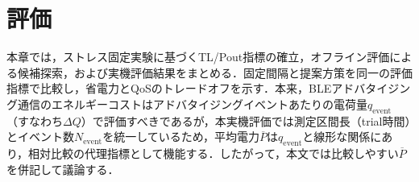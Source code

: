 \chapter{評価}
\label{ch:evaluation}
\clearpage

本章では，ストレス固定実験に基づくTL/Pout指標の確立，オフライン評価による候補探索，および実機評価結果をまとめる．固定間隔と提案方策を同一の評価指標で比較し，省電力とQoSのトレードオフを示す．本来，BLEアドバタイジング通信のエネルギーコストはアドバタイジングイベントあたりの電荷量$q_{\mathrm{event}}$（すなわち$\Delta Q$）で評価すべきであるが，本実機評価では測定区間長（trial時間）とイベント数$N_{\mathrm{event}}$を統一しているため，平均電力$\overline{P}$は$q_{\mathrm{event}}$と線形な関係にあり，相対比較の代理指標として機能する．したがって，本文では比較しやすい$\overline{P}$を併記して議論する．












